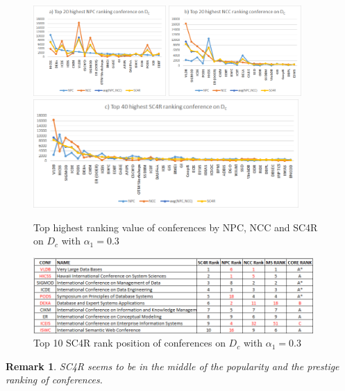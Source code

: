 \documentclass[10pt,leqno,twoside]{article}
\newtheorem{remark}{\indent Remark}[section]
\begin{document}
\begin{figure} %
	\caption{Top highest ranking value of conferences by NPC, NCC and SC4R on $D_c$ with $\alpha_1=0.3$}
	\label{Fig:Top20ConfDc}
    \centering
    \includegraphics[width=0.45\textwidth]{Dct20NPCc}
    \includegraphics[width=0.45\textwidth]{DCt20NCCc}
    \includegraphics[width=0.90\textwidth]{DCt40SC4Rc}   
\end{figure}
\begin{figure}
	\caption{Top 10 SC4R rank position of conferences on $D_c$ with $\alpha_1=0.3$}
	\label{Fig:Top10ConfDc}
    \centering
    \includegraphics[width=0.95\textwidth]{Top10Conf}
\end{figure}
%
\begin{remark}
SC4R seems to be in the middle of the popularity and the prestige ranking of conferences.
\end{remark}
\end{document}
